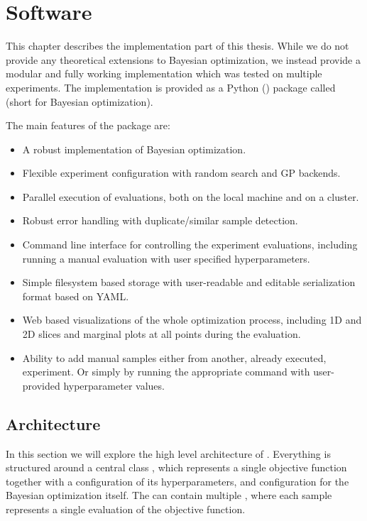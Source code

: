 \chapter{Software}
\label{chapter:software}

This chapter describes the implementation part of this thesis. While we do not provide any theoretical extensions to Bayesian optimization, we instead provide a modular and fully working implementation which was tested on multiple experiments. The implementation is provided as a Python (\cite{python}) package called \bopt (short for Bayesian optimization).

The main features of the package are:

\begin{itemize}
	\item A robust implementation of Bayesian optimization.
    \item Flexible experiment configuration with random search and GP backends.
    \item Parallel execution of evaluations, both on the local machine and on a cluster.
    \item Robust error handling with duplicate/similar sample detection.
    \item Command line interface for controlling the experiment evaluations, including running a manual evaluation with user specified hyperparameters.
    \item Simple filesystem based storage with user-readable and editable serialization format based on YAML.
    \item Web based visualizations of the whole optimization process, including
    1D and 2D slices and marginal plots at all points during the evaluation.
    \item Ability to add manual samples either from another, already executed, experiment. Or simply by running the appropriate command with user-provided hyperparameter values.
\end{itemize}


\section{Architecture}

In this section we will explore the high level architecture of \bopt. Everything is structured around a central class , which represents a single objective function together with a configuration of its hyperparameters, and configuration for the Bayesian optimization itself. The  can contain multiple , where each sample represents a single evaluation of the objective function.

